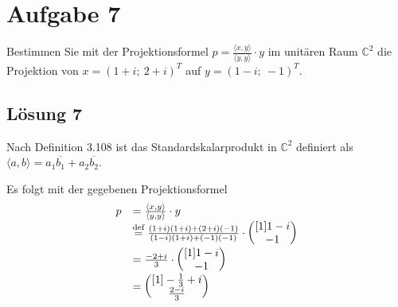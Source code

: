 \documentclass[main.tex]{subfiles}
\begin{document}
\section{Aufgabe 7}
Bestimmen Sie mit der Projektionsformel $p=\frac{\langle x,y\rangle }{\langle y,y\rangle } \cdotp y$ im unitären Raum $\mathbb{C}^{2}$ die Projektion von $x=( 1+i;\ 2+i)^{T}$ auf $y=( 1-i;\ -1)^{T}$.

\subsection{Lösung 7}
Nach Definition 3.108 ist das Standardskalarprodukt in $\mathbb{C}^{2}$ definiert als $\langle a,b\rangle =a_{1}\overline{b_{1}} +a_{2}\overline{b_{2}}$.

Es folgt mit der gegebenen Projektionsformel
\begin{equation*}
\begin{array}{ c l }
    p & =\frac{\langle x,y\rangle }{\langle y,y\rangle } \cdot y\\
    & \stackrel{\text{def}}{=} \frac{( 1+i)( 1+i) +( 2+i)( -1)}{( 1-i)( 1+i) +( -1)( -1)} \cdot \begin{pmatrix}[1]
    1-i\\
    -1
    \end{pmatrix}\\
    & =\frac{-2+i}{3} \cdot \begin{pmatrix}[1]
    1-i\\
    -1
    \end{pmatrix}\\
    & =\begin{pmatrix}[1]
    -\frac{1}{3} +i\\
    \frac{2-i}{3}
    \end{pmatrix}
    \end{array}
\end{equation*}
\end{document}
